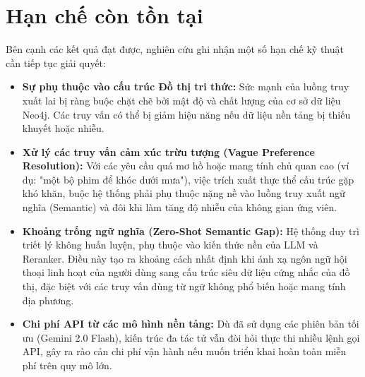 \section{Hạn chế còn tồn tại}
Bên cạnh các kết quả đạt được, nghiên cứu ghi nhận một số hạn chế kỹ thuật cần tiếp tục giải quyết:
\begin{itemize}
  \item \textbf{Sự phụ thuộc vào cấu trúc Đồ thị tri thức:} Sức mạnh của luồng truy xuất lai bị ràng buộc chặt chẽ bởi mật độ và chất lượng của cơ sở dữ liệu Neo4j. Các truy vấn có thể bị giảm hiệu năng nếu dữ liệu nền tảng bị thiếu khuyết hoặc nhiễu.
  \item \textbf{Xử lý các truy vấn cảm xúc trừu tượng (Vague Preference Resolution):} Với các yêu cầu quá mơ hồ hoặc mang tính chủ quan cao (ví dụ: "một bộ phim để khóc dưới mưa"), việc trích xuất thực thể cấu trúc gặp khó khăn, buộc hệ thống phải phụ thuộc nặng nề vào luồng truy xuất ngữ nghĩa (Semantic) và đôi khi làm tăng độ nhiễu của không gian ứng viên.
  \item \textbf{Khoảng trống ngữ nghĩa (Zero-Shot Semantic Gap):} Hệ thống duy trì triết lý không huấn luyện, phụ thuộc vào kiến thức nền của LLM và Reranker. Điều này tạo ra khoảng cách nhất định khi ánh xạ ngôn ngữ hội thoại linh hoạt của người dùng sang cấu trúc siêu dữ liệu cứng nhắc của đồ thị, đặc biệt với các truy vấn dùng từ ngữ không phổ biến hoặc mang tính địa phương.
  \item \textbf{Chi phí API từ các mô hình nền tảng:} Dù đã sử dụng các phiên bản tối ưu (Gemini 2.0 Flash), kiến trúc đa tác tử vẫn đòi hỏi thực thi nhiều lệnh gọi API, gây ra rào cản chi phí vận hành nếu muốn triển khai hoàn toàn miễn phí trên quy mô lớn.
\end{itemize}

